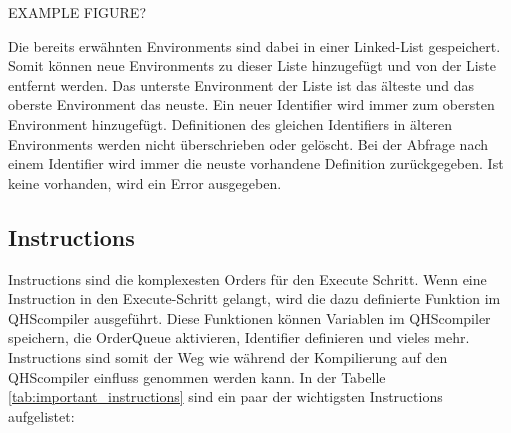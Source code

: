 EXAMPLE FIGURE?

Die bereits erwähnten Environments sind dabei in einer Linked-List gespeichert. Somit können neue Environments zu dieser Liste hinzugefügt und von der Liste entfernt werden.
Das unterste Environment der Liste ist das älteste und das oberste Environment das neuste.
Ein neuer Identifier wird immer zum obersten Environment hinzugefügt. Definitionen des gleichen Identifiers in älteren Environments werden nicht überschrieben oder gelöscht.
Bei der Abfrage nach einem Identifier wird immer die neuste vorhandene Definition zurückgegeben. Ist keine vorhanden, wird ein Error ausgegeben.

\subsection{Instructions}
Instructions sind die komplexesten Orders für den Execute Schritt. 
Wenn eine Instruction in den Execute-Schritt gelangt, wird die dazu definierte Funktion im QHScompiler ausgeführt.
Diese Funktionen können Variablen im QHScompiler speichern, die OrderQueue aktivieren, Identifier definieren und vieles mehr. Instructions sind somit der Weg wie während der Kompilierung auf den QHScompiler einfluss genommen werden kann.
In der Tabelle \ref{tab:important_instructions} sind ein paar der wichtigsten Instructions aufgelistet:


